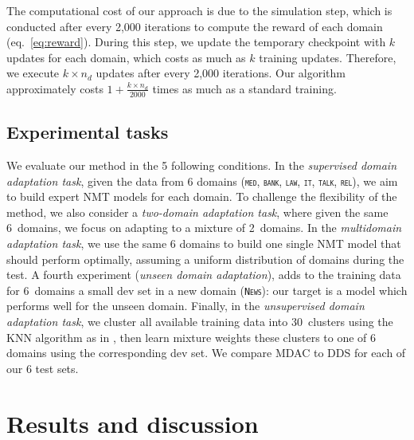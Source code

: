 \documentclass[11pt]{article}
\newcommand{\domain}[1]{\texttt{\textsc{#1}}}
\begin{document}
The computational cost of our approach is due to the simulation step, which is conducted after every 2,000 iterations to compute the reward of each domain (eq.~\eqref{eq:reward}). During this step, we update the temporary checkpoint with $k$ updates for each domain, which costs as much as $k$ training updates. Therefore, we execute $k \times n_d$ updates after every 2,000 iterations. Our algorithm approximately costs $1+\frac{k \times n_d}{2000}$ times as much as a standard training.

\subsection{Experimental tasks}
We evaluate our method in the 5 following conditions.
In the \emph{supervised domain adaptation task}, given the data from 6 domains (\domain{med}, \domain{bank}, \domain{law}, \domain{it}, \domain{talk}, \domain{rel}), we aim to build expert NMT models for each domain. To challenge the flexibility of the method, we also consider a \emph{two-domain adaptation task}, where given the same 6~domains, we focus on adapting to a mixture of 2~domains.
%
In the \emph{multidomain adaptation task}, we use the same 6 domains to build one single NMT model that should perform optimally, assuming a uniform distribution of domains during the test.
%
A fourth experiment (\emph{unseen domain adaptation}), adds to the training data for 6~domains a small dev set in a new domain (\domain{News}): our target is a model which performs well for the unseen domain.
%
Finally, in the \emph{unsupervised domain adaptation task}, we cluster all available training data into 30~clusters using the KNN algorithm as in \cite{Tars18multidomain}, then learn mixture weights these clusters to one of 6 domains using the corresponding dev set. We compare MDAC to DDS for each of our 6 test sets.

\section{Results and discussion \label{sec:results}}
\end{document}
